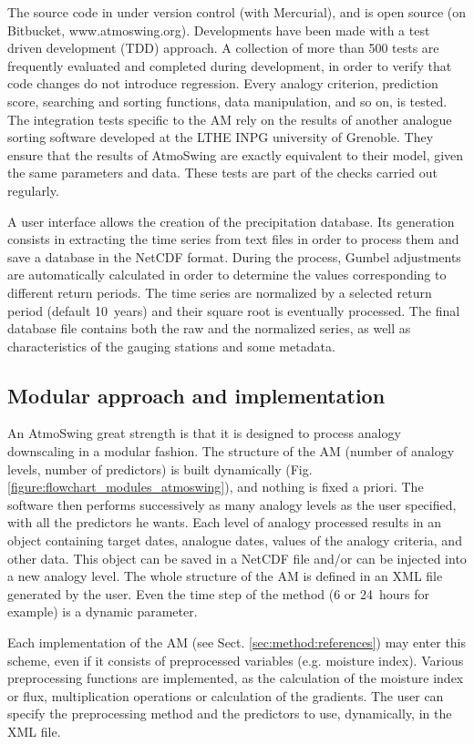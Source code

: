 \documentclass[review]{elsarticle}
\begin{document}
The source code in under version control (with Mercurial), and is open source (on Bitbucket, www.atmoswing.org). Developments have been made with a test driven development (TDD) approach. A collection of more than 500 tests are frequently evaluated and completed during development, in order to verify that code changes do not introduce regression. Every analogy criterion, prediction score, searching and sorting functions, data manipulation, and so on, is tested. The integration tests specific to the AM rely on the results of another analogue sorting software developed at the LTHE \textendash INPG university of Grenoble. They ensure that the results of AtmoSwing are exactly equivalent to their model, given the same parameters and data. These tests are part of the checks carried out regularly.

A user interface allows the creation of the precipitation database. Its generation consists in extracting the time series from text files in order to process them and save a database in the NetCDF format. During the process, Gumbel adjustments are automatically calculated in order to determine the values corresponding to different return periods. The time series are normalized by a selected return period (default 10~years) and their square root is eventually processed. The final database file contains both the raw and the normalized series, as well as characteristics of the gauging stations and some metadata.


\subsection{Modular approach and implementation}

An AtmoSwing great strength is that it is designed to process analogy downscaling in a modular fashion. The structure of the AM (number of analogy levels, number of predictors) is built dynamically (Fig. \ref{figure:flowchart_modules_atmoswing}), and nothing is fixed a priori. The software then performs successively as many analogy levels as the user specified, with all the predictors he wants. Each level of analogy processed results in an object containing target dates, analogue dates, values of the analogy criteria, and other data. This object can be saved in a NetCDF file and/or can be injected into a new analogy level. The whole structure of the AM is defined in an XML file generated by the user. Even the time step of the method (6 or 24~hours for example) is a dynamic parameter.

Each implementation of the AM (see Sect. \ref{sec:method:references}) may enter this scheme, even if it consists of preprocessed variables (e.g. moisture index). Various preprocessing functions are implemented, as the calculation of the moisture index or flux, multiplication operations or calculation of the gradients. The user can specify the preprocessing method and the predictors to use, dynamically, in the XML file.
\end{document}
